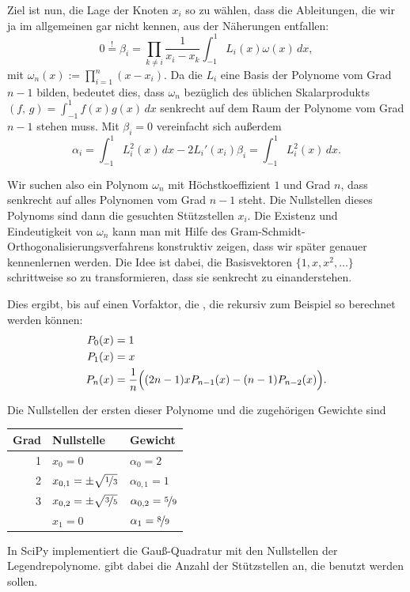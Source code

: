 \noindent Ziel ist nun, die Lage der Knoten $x_i$ so zu wählen, dass
die Ableitungen, die wir ja im allgemeinen gar nicht kennen, aus der
Näherungen entfallen:
\begin{equation}
  \label{eq:gaussortho}
  0 \stackrel{!}{=} \beta_i = \prod_{k\neq i}\frac{1}{x_i-x_k}
  \int_{-1}^1 L_i(x)\omega(x)\, dx,
\end{equation}
mit $\omega_n(x):=\prod_{i=1}^n(x-x_i)$. Da die $L_i$ eine Basis der
Polynome vom Grad $n-1$ bilden, bedeutet dies, dass $\omega_n$
bezüglich des üblichen Skalarprodukts $(f,\,g) = \int_{-1}^1
f(x)g(x)\,dx$ senkrecht auf dem Raum der Polynome vom Grad $n-1$
stehen muss. Mit $\beta_i=0$ vereinfacht sich außerdem
\begin{equation}
  \alpha_i = \int_{-1}^1 L_i^2(x)\,dx - 2L_i'(x_i)\beta_i
  = \int_{-1}^1 L_i^2(x)\, dx.
\end{equation}

Wir suchen also ein Polynom $\omega_n$ mit Höchstkoeffizient $1$ und
Grad $n$, dass senkrecht auf alles Polynomen vom Grad $n-1$ steht. Die
Nullstellen dieses Polynoms sind dann die gesuchten Stützstellen
$x_i$.  Die Existenz und Eindeutigkeit von $\omega_n$ kann man mit
Hilfe des Gram-Schmidt-Orthogonalisierungsverfahrens konstruktiv
zeigen, dass wir später genauer kennenlernen werden. Die Idee ist
dabei, die Basisvektoren $\{1, x, x^2,\ldots\}$ schrittweise so zu
transformieren, dass sie senkrecht zu einanderstehen.

Dies ergibt, bis auf einen Vorfaktor, die
\emph{}, die rekursiv zum Beispiel so
berechnet werden können:
\begin{align}
  P_0(x) &= 1\nonumber\\
  P_1(x) &= x\nonumber\\
  P_n(x) &= \frac{1}{n}\Bigl((2n-1)xP_{n-1}(x) -
    (n-1)P_{n-2}(x)\Bigr).
\end{align}
{\samepage Die Nullstellen der ersten dieser Polynome und die
zugehörigen Gewichte sind
\begin{center}
  \renewcommand{\arraystretch}{1.2}
  \begin{tabular}{r|l|l}
    Grad & Nullstelle & Gewicht\\
    \hline\hline
    1    & $x_0=0$         & $\alpha_0=2$\\
    \hline
    2    & $x_{0,1} = \pm \sqrt{\nicefrac{1}{3}}$ &
    $\alpha_{0,1} = 1$ \\
    \hline
    3    & $x_{0,2} =  \pm \sqrt{\nicefrac{3}{5}}$ &
    $\alpha_{0,2}=\nicefrac{5}{9}$\\
    {}   & $x_1 =  0$                             &
    $\alpha_1=\nicefrac{8}{9}$\\
  \end{tabular}
\end{center}}
In SciPy implementiert  die Gauß-Quadratur mit den Nullstellen der
Legendrepolynome.  gibt dabei die Anzahl der Stützstellen an,
die benutzt werden sollen.

